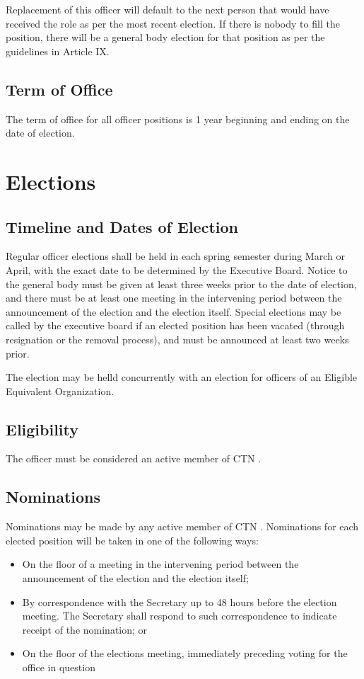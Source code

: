 \documentclass{article}
\def\clubname{CTN }
\begin{document}
Replacement of this officer will default to the next person that would have received the role as per the most recent election. If there is nobody to fill the position, there will be a general body election for that position as per the guidelines in Article IX.

\subsection{Term of Office}

The term of office for all officer positions is 1 year beginning and ending on the date of election.

\section{Elections}
\subsection{Timeline and Dates of Election}
Regular officer elections shall be held in each spring semester during March or April, with the exact date to be determined by the Executive Board. Notice to the general body must be given at least three weeks prior to the date of election, and there must be at least one meeting in the intervening period between the announcement of the election and the election itself. Special elections may be called by the executive board if an elected position has been vacated (through resignation or the removal process), and must be announced at least two weeks prior.

The election may be helld concurrently with an election for officers of an Eligible Equivalent Organization.

\subsection{Eligibility}
The officer must be considered an active member of \clubname.

\subsection{Nominations}
Nominations may be made by any active member of \clubname. Nominations for each elected position will be taken in one of the following ways:
\begin{itemize}
    \item On the floor of a meeting in the intervening period between the announcement of the election and the election itself;
    \item By correspondence with the Secretary up to 48 hours before the election meeting. The Secretary shall respond to such correspondence to indicate receipt of the nomination; or
    \item On the floor of the elections meeting, immediately preceding voting for the office in question
\end{itemize}
\end{document}
